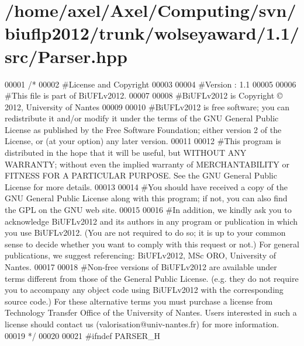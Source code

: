 \hypertarget{Parser_8hpp_source}{\section{/home/axel/\-Axel/\-Computing/svn/biuflp2012/trunk/wolseyaward/1.1/src/\-Parser.hpp}
}

\begin{DoxyCode}
00001 \textcolor{comment}{/*}
00002 \textcolor{comment}{ #License and Copyright}
00003 \textcolor{comment}{ }
00004 \textcolor{comment}{ #Version : 1.1}
00005 \textcolor{comment}{ }
00006 \textcolor{comment}{ #This file is part of BiUFLv2012.}
00007 \textcolor{comment}{ }
00008 \textcolor{comment}{ #BiUFLv2012 is Copyright © 2012, University of Nantes}
00009 \textcolor{comment}{ }
00010 \textcolor{comment}{ #BiUFLv2012 is free software; you can redistribute it and/or modify it under
       the terms of the GNU General Public License as published by the Free Software
       Foundation; either version 2 of the License, or (at your option) any later version.}
00011 \textcolor{comment}{ }
00012 \textcolor{comment}{ #This program is distributed in the hope that it will be useful, but WITHOUT
       ANY WARRANTY; without even the implied warranty of MERCHANTABILITY or FITNESS FOR
       A PARTICULAR PURPOSE. See the GNU General Public License for more details.}
00013 \textcolor{comment}{ }
00014 \textcolor{comment}{ #You should have received a copy of the GNU General Public License along with
       this program; if not, you can also find the GPL on the GNU web site.}
00015 \textcolor{comment}{ }
00016 \textcolor{comment}{ #In addition, we kindly ask you to acknowledge BiUFLv2012 and its authors in
       any program or publication in which you use BiUFLv2012. (You are not required to
       do so; it is up to your common sense to decide whether you want to comply with
       this request or not.) For general publications, we suggest referencing: 
       BiUFLv2012, MSc ORO, University of Nantes.}
00017 \textcolor{comment}{ }
00018 \textcolor{comment}{ #Non-free versions of BiUFLv2012 are available under terms different from
       those of the General Public License. (e.g. they do not require you to accompany any
       object code using BiUFLv2012 with the corresponding source code.) For these
       alternative terms you must purchase a license from Technology Transfer Office of the
       University of Nantes. Users interested in such a license should contact us
       (valorisation@univ-nantes.fr) for more information.}
00019 \textcolor{comment}{ */}
00020 
00021 \textcolor{preprocessor}{#ifndef PARSER\_H}

\end{DoxyCode}

